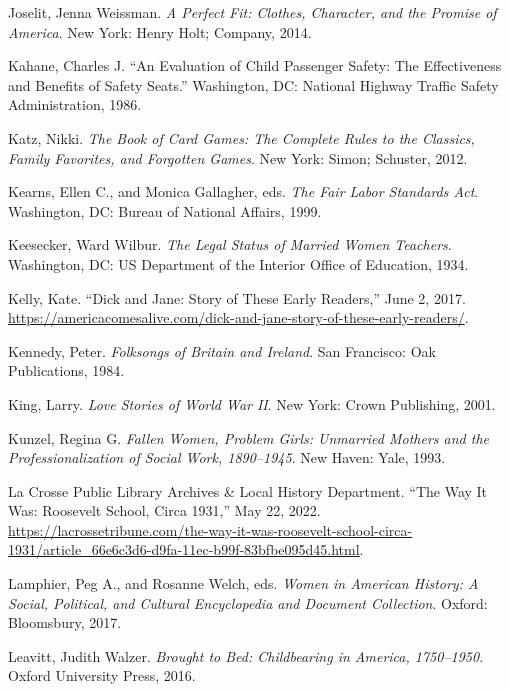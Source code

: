 \documentclass[
  american,
  letterpaper,
]{book}
\newlength{\cslhangindent}
\newenvironment{CSLReferences}[2] %
 {\begin{list}{}{%
  \setlength{\itemindent}{0pt}
  \setlength{\leftmargin}{0pt}
  \setlength{\parsep}{0pt}
  \ifodd #1
   \setlength{\leftmargin}{\cslhangindent}
   \setlength{\itemindent}{-1\cslhangindent}
  \fi
  \setlength{\itemsep}{#2\baselineskip}}}
 {\end{list}}
\begin{document}
\begin{CSLReferences}{1}{0}
Joselit, Jenna Weissman. \emph{A Perfect Fit: Clothes, Character, and
the Promise of America}. New York: Henry Holt; Company, 2014.

Kahane, Charles J. {``An Evaluation of Child Passenger Safety: The
Effectiveness and Benefits of Safety Seats.''} Washington, DC: National
Highway Traffic Safety Administration, 1986.

Katz, Nikki. \emph{The Book of Card Games: The Complete Rules to the
Classics, Family Favorites, and Forgotten Games}. New York: Simon;
Schuster, 2012.

Kearns, Ellen C., and Monica Gallagher, eds. \emph{The Fair Labor
Standards Act}. Washington, DC: Bureau of National Affairs, 1999.

Keesecker, Ward Wilbur. \emph{The Legal Status of Married Women
Teachers}. Washington, DC: US Department of the Interior Office of
Education, 1934.

Kelly, Kate. {``Dick and Jane: Story of These Early Readers,''} June 2,
2017.
\url{https://americacomesalive.com/dick-and-jane-story-of-these-early-readers/}.

Kennedy, Peter. \emph{Folksongs of Britain and Ireland}. San Francisco:
Oak Publications, 1984.

King, Larry. \emph{Love Stories of World War II}. New York: Crown
Publishing, 2001.

Kunzel, Regina G. \emph{Fallen Women, Problem Girls: Unmarried Mothers
and the Professionalization of Social Work, 1890--1945}. New Haven:
Yale, 1993.

La Crosse Public Library Archives \& Local History Department. {``The
Way It Was: Roosevelt School, Circa 1931,''} May 22, 2022.
\url{https://lacrossetribune.com/the-way-it-was-roosevelt-school-circa-1931/article_66e6c3d6-d9fa-11ec-b99f-83bfbe095d45.html}.

Lamphier, Peg A., and Rosanne Welch, eds. \emph{Women in American
History: A Social, Political, and Cultural Encyclopedia and Document
Collection}. Oxford: Bloomsbury, 2017.

Leavitt, Judith Walzer. \emph{Brought to Bed: Childbearing in America,
1750--1950}. Oxford University Press, 2016.


\end{CSLReferences}
\end{document}
